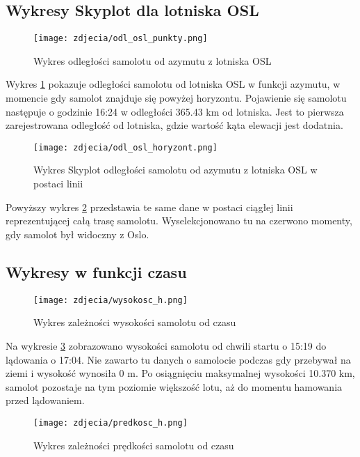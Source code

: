 \documentclass[fleqn,10pt,a4paper]{article}
\begin{document}
\clearpage

\subsection{Wykresy Skyplot dla lotniska OSL}
\begin{figure}[h!]
  \centering
  \texttt{[image: zdjecia/odl\_osl\_punkty.png]}
  \caption{Wykres odległości samolotu od azymutu z lotniska OSL}
  \label{skyplot_osl}
\end{figure}

Wykres \ref{skyplot_osl} pokazuje odległości samolotu od lotniska OSL w funkcji azymutu, w momencie gdy samolot znajduje się powyżej horyzontu.
Pojawienie się samolotu następuje o godzinie 16:24 w odległości 365.43 km od lotniska. Jest to pierwsza zarejestrowana odległość od lotniska, gdzie wartość
kąta elewacji jest dodatnia.

\begin{figure}[ht!]
  \centering
  \texttt{[image: zdjecia/odl\_osl\_horyzont.png]}
  \caption{Wykres Skyplot odległości samolotu od azymutu z lotniska OSL w postaci linii}
  \label{skyplot_odl_osl}
\end{figure}

Powyższy wykres \ref{skyplot_odl_osl} przedstawia te same dane w postaci ciągłej linii reprezentującej całą trasę samolotu.
Wyselekcjonowano tu na czerwono momenty, gdy samolot był widoczny z Oslo.

\clearpage

\subsection{Wykresy w funkcji czasu}

\begin{figure}[ht!]
  \centering
  \texttt{[image: zdjecia/wysokosc\_h.png]}
  \caption{Wykres zależności wysokości samolotu od czasu}
  \label{wys_h}
\end{figure}

Na wykresie \ref{wys_h} zobrazowano wysokości samolotu od chwili startu o 15:19 do lądowania o 17:04. 
Nie zawarto tu danych o samolocie podczas gdy przebywał na ziemi i wysokość wynosiła 0 m. Po osiągnięciu maksymalnej wysokości
10.370 km, samolot pozostaje na tym poziomie większość lotu, aż do momentu hamowania przed lądowaniem.

\begin{figure}[ht!]
    \centering
    \texttt{[image: zdjecia/predkosc\_h.png]}
    \caption{Wykres zależności prędkości samolotu od czasu}
    \label{pred_h}
  \end{figure}
\end{document}
